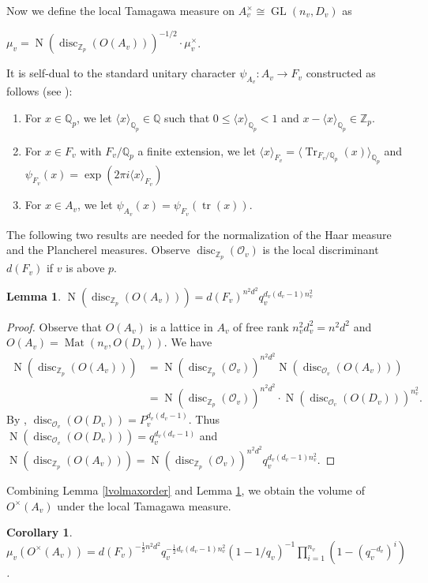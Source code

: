 \documentclass[11pt]{article}
\theoremstyle{plain}
\newtheorem{lemma}[theorem]{Lemma}
\newtheorem{corollary}[theorem]{Corollary}
\theoremstyle{remark}
\theoremstyle{definition}
\DeclareMathOperator{\tr}{tr}
\DeclareMathOperator{\Tr}{Tr}
\DeclareMathOperator{\GL}{GL}
\DeclareMathOperator{\Mt}{Mat}
\DeclareMathOperator{\disc}{disc}
\DeclareMathOperator{\N}{N}
\begin{document}
Now we define the local Tamagawa measure on $A_v^{\times}\cong \GL(n_v,D_v)$ as 
\begin{center}
    $\mu_v=\N(\disc_{\mathbb{Z}_p}(O(A_v)))^{-1/2}\cdot \mu^{\times}_v$. 
\end{center}
It is self-dual to the standard unitary character $\psi_{A_v}\colon A_v\to  F_v$ constructed as follows (see \cite[Proposition 29.7.7]{Voight21}):
\begin{enumerate}
    \item For $x\in \mathbb{Q}_p$, we let $\langle x\rangle_{\mathbb{Q}_p}\in \mathbb{Q}$ such that $0\leq \langle x\rangle_{\mathbb{Q}_p}<1$ and $x-\langle x\rangle_{\mathbb{Q}_p}\in\mathbb{Z}_p$.
    \item For $x \in F_v$ with $F_v/\mathbb{Q}_p$ a finite extension, we let $\langle x\rangle_{F_v}=\langle \Tr_{F_v/\mathbb{Q}_p} (x)\rangle_{\mathbb{Q}_p}$ and $\psi_{F_v}(x)=\exp(2\pi i \langle x\rangle_{F_v})$
    \item For $x\in A_v$, we let $\psi_{A_v}(x)=\psi_{F_v}(\tr(x))$.  
\end{enumerate}

The following two results are needed for the normalization of the Haar measure and the Plancherel measures. 
Observe $\disc_{\mathbb{Z}_p}(\mathcal{O}_v)$ is the local discriminant $d(F_v)$ if $v$ is above $p$. 
\begin{lemma}\label{lpNdisc}
$\N(\disc_{\mathbb{Z}_p}(O(A_v)))=d(F_v)^{n^2d^2}q_v^{d_{v}(d_{v}-1)n_v^2}$
\end{lemma}
\begin{proof}
Observe that $O(A_v)$ is a lattice in $A_v$ of free rank $n_v^2 d_v^2=n^2d^2$ and $O(A_v)=\Mt(n_v,O(D_v))$. 
We have
\begin{equation*}
\begin{aligned}
    \N(\disc_{\mathbb{Z}_p}(O(A_v)))&=\N(\disc_{\mathbb{Z}_p}(\mathcal{O}_v))^{n^2d^2}\N(\disc_{\mathcal{O}_v}(O(A_v)))\\
    &=\N(\disc_{\mathbb{Z}_p}(\mathcal{O}_v))^{n^2d^2}\cdot \N(\disc_{\mathcal{O}_v}(O(D_v)))^{n_v^2}.
\end{aligned}
\end{equation*}
By \cite[Theorem 14.9]{Rei03}, $\disc_{\mathcal{O}_v}(O(D_v))=P_{v}^{d_{v}(d_{v}-1)}$. 
Thus $\N(\disc_{\mathcal{O}_v}(O(D_v)))=q_{v}^{d_{v}(d_{v}-1)}$ and $\N(\disc_{\mathbb{Z}_p}(O(A_v)))=\N(\disc_{\mathbb{Z}_p}(\mathcal{O}_v))^{n^2d^2}q_v^{d_{v}(d_{v}-1)n_v^2}$.  
\end{proof}

Combining Lemma \ref{lvolmaxorder} and Lemma \ref{lpNdisc}, we obtain the volume of $O^{\times}(A_v)$ under the local Tamagawa measure.
\begin{corollary}\label{cTamaMaxod}
$\mu_v(O^{\times}(A_v))=d(F_v)^{-\frac{1}{2}n^2d^2}q_v^{-\frac{1}{2}d_{v}(d_{v}-1)n_v^2}(1-1/q_v)^{-1}\prod_{i=1}^{n_v}(1-(q_v^{-d_v})^i)$.
\end{corollary}
\end{document}
